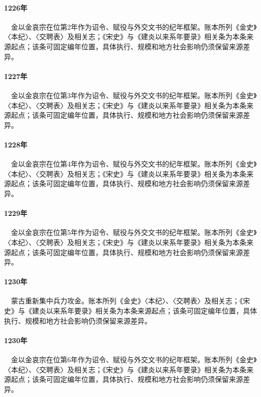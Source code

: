 \paragraph{1226年}　金以金哀宗在位第2年作为诏令、赋役与外交文书的纪年框架。账本所列《金史》〈本纪〉、〈交聘表〉及相关志；《宋史》与《建炎以来系年要录》相关条为本条来源起点；该条可固定编年位置，具体执行、规模和地方社会影响仍须保留来源差异。

\paragraph{1227年}　金以金哀宗在位第3年作为诏令、赋役与外交文书的纪年框架。账本所列《金史》〈本纪〉、〈交聘表〉及相关志；《宋史》与《建炎以来系年要录》相关条为本条来源起点；该条可固定编年位置，具体执行、规模和地方社会影响仍须保留来源差异。

\paragraph{1228年}　金以金哀宗在位第4年作为诏令、赋役与外交文书的纪年框架。账本所列《金史》〈本纪〉、〈交聘表〉及相关志；《宋史》与《建炎以来系年要录》相关条为本条来源起点；该条可固定编年位置，具体执行、规模和地方社会影响仍须保留来源差异。

\paragraph{1229年}　金以金哀宗在位第5年作为诏令、赋役与外交文书的纪年框架。账本所列《金史》〈本纪〉、〈交聘表〉及相关志；《宋史》与《建炎以来系年要录》相关条为本条来源起点；该条可固定编年位置，具体执行、规模和地方社会影响仍须保留来源差异。

\paragraph{1230年}　蒙古重新集中兵力攻金。账本所列《金史》〈本纪〉、〈交聘表〉及相关志；《宋史》与《建炎以来系年要录》相关条为本条来源起点；该条可固定编年位置，具体执行、规模和地方社会影响仍须保留来源差异。

\paragraph{1230年}　金以金哀宗在位第6年作为诏令、赋役与外交文书的纪年框架。账本所列《金史》〈本纪〉、〈交聘表〉及相关志；《宋史》与《建炎以来系年要录》相关条为本条来源起点；该条可固定编年位置，具体执行、规模和地方社会影响仍须保留来源差异。

